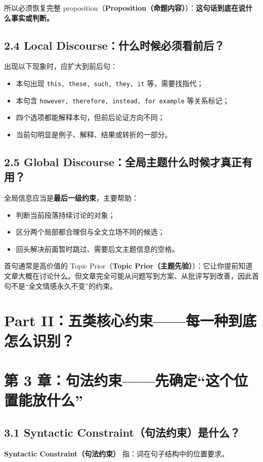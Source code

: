 \documentclass[11pt,a4paper]{ctexart}
\newcommand{\kw}[1]{\textbf{#1}}
\newcommand{\term}[2]{\textbf{#1（#2）}}
\begin{document}
所以必须恢复完整 proposition（\term{Proposition}{命题内容}）：\kw{这句话到底在说什么事实或判断。}

\subsection{2.4 Local Discourse：什么时候必须看前后？}
出现以下现象时，应扩大到前后句：
\begin{itemize}
  \item 本句出现 \texttt{this, these, such, they, it} 等，需要找指代；
  \item 本句含 \texttt{however, therefore, instead, for example} 等关系标记；
  \item 四个选项都能解释本句，但前后论证方向不同；
  \item 当前句明显是例子、解释、结果或转折的一部分。
\end{itemize}

\subsection{2.5 Global Discourse：全局主题什么时候才真正有用？}
全局信息应当是\kw{最后一级约束}，主要帮助：
\begin{itemize}
  \item 判断当前段落持续讨论的对象；
  \item 区分两个局部都合理但与全文立场不同的候选；
  \item 回头解决前面暂时跳过、需要后文主题信息的空格。
\end{itemize}

\begin{warn}
首句通常是高价值的 Topic Prior（\term{Topic Prior}{主题先验}）：它让你提前知道文章大概在讨论什么。但文章完全可能从问题写到方案、从批评写到改善，因此首句不是“全文情感永久不变”的约束。
\end{warn}

\newpage
\section{Part II：五类核心约束——每一种到底怎么识别？}

\section{第 3 章：句法约束——先确定“这个位置能放什么”}

\subsection{3.1 Syntactic Constraint（句法约束）是什么？}
\term{Syntactic Constraint}{句法约束} 指：词在句子结构中的位置要求。
\end{document}
